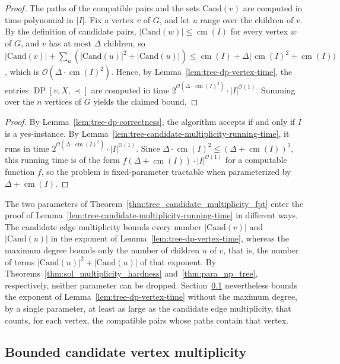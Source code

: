 \documentclass[a4paper,USenglish,thm-restate]{lipics-v2021}
\newcommand{\cm}{\operatorname{cm}}
\newcommand{\cand}{\mathrm{Cand}}
\theoremstyle{problemstyle}
\begin{document}
\begin{proof}
The paths of the compatible pairs and the sets $\cand(v)$ are computed in time polynomial in $|I|$. Fix a vertex $v$ of $G$, and let $u$ range over the children of $v$. By the definition of candidate pairs, $|\cand(w)|\le\cm(I)$ for every vertex $w$ of $G$, and $v$ has at most $\Delta$ children, so $|\cand(v)|+\sum_u(|\cand(u)|^2+|\cand(u)|)\le\cm(I)+\Delta\bigl(\cm(I)^2+\cm(I)\bigr)$, which is $\mathcal{O}(\Delta\cdot\cm(I)^2)$. Hence, by Lemma~\ref{lem:tree-dp-vertex-time}, the entries $\operatorname{DP}[v,X,\prec]$ are computed in time $2^{\mathcal{O}(\Delta\cdot\cm(I)^2)}\cdot|I|^{\mathcal{O}(1)}$. Summing over the $n$ vertices of $G$ yields the claimed bound.
\end{proof}

\treeCandidateMultiplicityFpt*

\begin{proof}
By Lemma~\ref{lem:tree-dp-correctness}, the algorithm accepts if and only if $I$ is a yes-instance. By Lemma~\ref{lem:tree-candidate-multiplicity-running-time}, it runs in time $2^{\mathcal{O}(\Delta\cdot\cm(I)^2)}\cdot|I|^{\mathcal{O}(1)}$. Since $\Delta\cdot\cm(I)^2\le(\Delta+\cm(I))^3$, this running time is of the form $f(\Delta+\cm(I))\cdot|I|^{\mathcal{O}(1)}$ for a computable function $f$, so the problem is fixed-parameter tractable when parameterized by $\Delta+\cm(I)$.
\end{proof}

The two parameters of Theorem~\ref{thm:tree_candidate_multiplicity_fpt} enter the proof of Lemma~\ref{lem:tree-candidate-multiplicity-running-time} in different ways. The candidate edge multiplicity bounds every number $|\cand(v)|$ and $|\cand(u)|$ in the exponent of Lemma~\ref{lem:tree-dp-vertex-time}, whereas the maximum degree bounds only the number of children $u$ of $v$, that is, the number of terms $|\cand(u)|^2+|\cand(u)|$ of that exponent. By Theorems~\ref{thm:sol_multiplicity_hardness} and~\ref{thm:para_np_tree}, respectively, neither parameter can be dropped. Section~\ref{sec:treecvmfpt} nevertheless bounds the exponent of Lemma~\ref{lem:tree-dp-vertex-time} without the maximum degree, by a single parameter, at least as large as the candidate edge multiplicity, that counts, for each vertex, the compatible pairs whose paths contain that vertex.

\subsection{Bounded candidate vertex multiplicity}
\label{sec:treecvmfpt}
\end{document}
